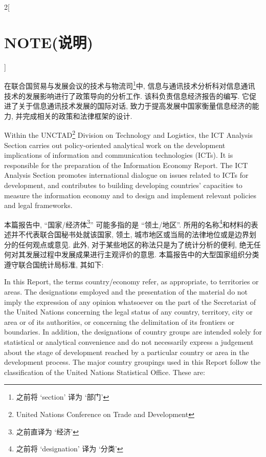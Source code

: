 \documentclass[a4paper, UTF8, 12pt]{article}
\begin{document}
\begin{paracol}{2}[\section{NOTE(说明)}]
    
    \switchcolumn*
    在联合国贸易与发展会议的技术与物流司\footnote{之前将 `section' 译为 `部门'}中, 信息与通讯技术分析科对信息通讯技术的发展影响进行了政策导向的分析工作. 该科负责信息经济报告的编写. 它促进了关于信息通讯技术发展的国际对话, 致力于提高发展中国家衡量信息经济的能力, 并完成相关的政策和法律框架的设计.

    \switchcolumn
    Within the UNCTAD\footnote{United Nations Conference on Trade and Development} Division on Technology and Logistics, the ICT Analysis Section carries out policy-oriented analytical work on the development implications of information and communication technologies (ICTs). It is responsible for the preparation of the Information Economy Report. The ICT Analysis Section promotes international dialogue on issues related to ICTs for development, and contributes to building developing countries’ capacities to measure the information economy and to design and implement relevant policies and legal frameworks. 

    \switchcolumn*
    本篇报告中, ``国家/经济体\footnote{之前直译为 `经济'}'' 可能多指的是 ``领土/地区''. 所用的名称\footnote{之前将 `designation' 译为 `分类'}和材料的表述并不代表联合国秘书处就该国家, 领土, 城市地区或当局的法律地位或是边界划分的任何观点或意见. 此外, 对于某些地区的称法只是为了统计分析的便利, 绝无任何对其发展过程中发展成果进行主观评价的意思. 本篇报告中的大型国家组织分类遵守联合国统计局标准, 其如下:

    \switchcolumn
    In this Report, the terms country/economy refer, as appropriate, to territories or areas. The designations employed and the presentation of the material do not imply the expression of any opinion whatsoever on the part of the Secretariat of the United Nations concerning the legal status of any country, territory, city or area or of its authorities, or concerning the delimitation of its frontiers or boundaries. In addition, the designations of country groups are intended solely for statistical or analytical convenience and do not necessarily express a judgement about the stage of development reached by a particular country or area in the development process. The major country groupings used in this Report follow the classification of the United Nations Statistical Office. These are: 


\end{paracol}
\end{document}
